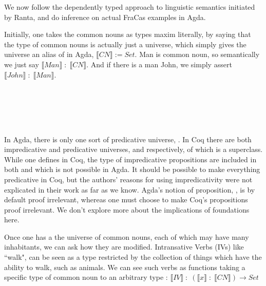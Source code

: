 We now follow the dependently typed approach to linguistic semantics initiated
by Ranta, and do inference on actual FraCas examples in Agda.

Initially, one takes the common nouns as types maxim literally, by saying that
the type of common nouns is actually just a universe, which simply gives the
universe an alias of  in Agda, $\llbracket CN \rrbracket := Set$. Man
is common noun, so semantically we just say $\llbracket Man \rrbracket\; {:}\;
\llbracket CN \rrbracket$. And if there is a man John, we simply assert
$\llbracket John \rrbracket\; {:}\; \llbracket Man \rrbracket$.

\begin{code}%
\>[0]\AgdaSpace{}%
\AgdaSymbol{=}\AgdaSpace{}%
\<%
\\
%
\\[\AgdaEmptyExtraSkip]%
\>[0]\<%
\\
\>[0][@{}l@{\AgdaIndent{0}}]%
\>[2]\AgdaSpace{}%
\AgdaSymbol{:}\AgdaSpace{}%
\<%
\\
%
\>[2]\AgdaSpace{}%
\AgdaSymbol{:}\AgdaSpace{}%
\<%
\end{code}

In Agda, there is only one sort of predicative universe, . In Coq
there are both impredicative and predicative universes,  and
 respectively, of which  is a superclass. While one defines
 in Coq, the type of impredicative propositions are included in
both \cite{fracoq} and \cite{luoCoq} which is not possible in Agda. It should be
possible to make everything predicative in Coq, but the authors' reasons for
using impredicativity were not explicated in their work as far as we know.
Agda's notion of proposition, , is by default proof irrelevant,
whereas one must choose to make Coq's propositions proof irrelevant. We don't
explore more about the implications of foundations here.

Once one has a the universe of common nouns, each of which may have many
inhabitants, we can ask how they are modified. Intransative Verbs (IVs) like
``walk", can be seen as a type restricted by the collection of things which have
the ability to walk, such as animals. We can see such verbs as functions taking a
specific type of common noun to an arbitrary type : $\llbracket IV \rrbracket\;
{:}\; (\llbracket x \rrbracket\; {:}\; \llbracket CN \rrbracket) \rightarrow
Set$

